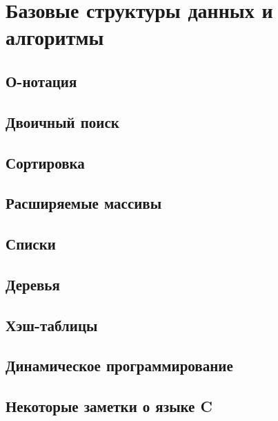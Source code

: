 \chapter{Базовые структуры данных и алгоритмы}
\label{ch:basic-ds}

\section{О-нотация}
\section{Двоичный поиск}
\section{Сортировка}
\section{Расширяемые массивы}
\section{Списки}
\section{Деревья}
\section{Хэш-таблицы}
\section{Динамическое программирование}
\section{Некоторые заметки о языке C}
